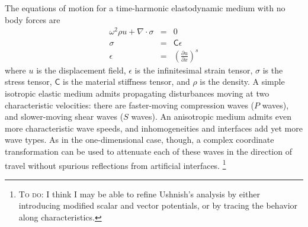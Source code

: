 \documentclass{article}
\newcommand{\sfC}{\mathsf{C}}
\newcommand{\note}[1]{\footnote{\textsc{To do}: #1}}
\begin{document}
The equations of motion for a time-harmonic elastodynamic medium with
no body forces are
\begin{eqnarray}
  \omega^2 \rho u + \nabla \cdot \sigma & = & 0 \label{strong-form-eq} \\
  \sigma & = & \sfC \epsilon 
    \label{linear-stress-strain-eq} \\
  \epsilon & = & \left( \frac{\partial u}{\partial x} \right)^s
\end{eqnarray}
where $u$ is the displacement field, $\epsilon$ is the infinitesimal
strain tensor, $\sigma$ is the stress tensor, $\sfC$ is the material
stiffness tensor, and $\rho$ is the density.  A simple isotropic
elastic medium admits propagating disturbances moving at two characteristic
velocities: there are faster-moving compression waves ($P$ waves), and
slower-moving shear waves ($S$ waves).  An anisotropic medium admits
even more characteristic wave speeds, and inhomogeneities and interfaces
add yet more wave types.
As in the one-dimensional case, though,
a complex coordinate transformation can be used to attenuate each
of these waves in the direction of travel without spurious reflections
from artificial interfaces.
\note{
  I think I may be able to refine Ushnish's analysis by either
  introducing modified scalar and vector potentials, or by tracing the
  behavior along characteristics.
}
\end{document}
